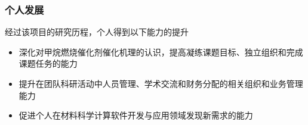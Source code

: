 \documentclass[cjk,slidestop,compress,mathserif,blue]{beamer}
\begin{document}
\frame
{
	\frametitle{个人发展}
经过该项目的研究历程，个人得到以下能力的提升
	\begin{itemize}
		\setlength{\itemsep}{15pt}
		\item 深化对甲烷燃烧催化剂催化机理的认识，提高凝练课题目标、独立组织和完成课题任务的能力
		\item 提升在团队科研活动中人员管理、学术交流和财务分配的相关组织和业务管理能力
		\item 促进个人在材料科学计算软件开发与应用领域发现新需求的能力
	\end{itemize}
}




\end{document}
